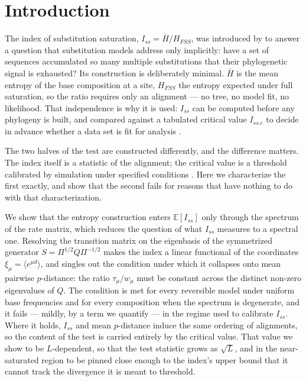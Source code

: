 \documentclass[preprint,12pt,authoryear]{elsarticle}
\newcommand{\Iss}{I_{ss}}
\newcommand{\Issc}{I_{ss.c}}
\newcommand{\Hbar}{\bar H}
\newcommand{\HFSS}{H_{FSS}}
\newcommand{\E}{\mathbb{E}}
\theoremstyle{definition}
\theoremstyle{remark}
\begin{document}
\section{Introduction}

The index of substitution saturation, $\Iss=\Hbar/\HFSS$, was introduced by
\citet{xia2003iss} to answer a question that substitution models address only
implicitly: have a set of sequences accumulated so many multiple substitutions
that their phylogenetic signal is exhausted? Its construction is deliberately
minimal. $\Hbar$ is the mean entropy of the base composition at a site,
$\HFSS$ the entropy expected under full saturation, so the ratio requires only
an alignment --- no tree, no model fit, no likelihood. That independence is why
it is used: $\Iss$ can be computed before any phylogeny is built, and compared
against a tabulated critical value $\Issc$ to decide in advance whether a data
set is fit for analysis \citep{xia2003iss,xia2009handbook}.

The two halves of the test are constructed differently, and the difference
matters. The index itself is a statistic of the alignment; the critical value
is a threshold calibrated by simulation under specified conditions
\citep{xia2003iss}. Here we characterize the first exactly, and show that the
second fails for reasons that have nothing to do with that characterization.

We show that the entropy construction enters $\E[\Iss]$ only through the
spectrum of the rate matrix, which reduces the question of what $\Iss$ measures
to a spectral one. Resolving the transition matrix on the eigenbasis of the
symmetrized generator $S=\Pi^{1/2}Q\Pi^{-1/2}$ makes the index a linear
functional of the coordinates $\xi_\mu=\langle e^{\mu d}\rangle$, and singles
out the condition under which it collapses onto mean pairwise $p$-distance:
the ratio $\tau_\mu/w_\mu$ must be constant across the distinct non-zero
eigenvalues of $Q$. The condition is met for every reversible model under
uniform base frequencies and for every composition when the spectrum is
degenerate, and it fails --- mildly, by a term we quantify --- in the
regime used to calibrate $\Iss$. Where it holds, $\Iss$ and mean
$p$-distance induce the same ordering of alignments, so the content of the
test is carried entirely by the critical value. That value we show to be
$L$-dependent, so that the test statistic grows as $\sqrt{L}$, and in the
near-saturated region to be pinned close enough to the index's upper bound
that it cannot track the divergence it is meant to threshold.
\end{document}
